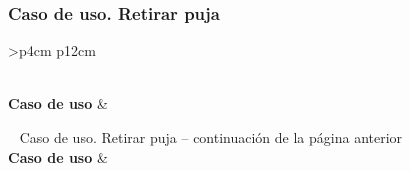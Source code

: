 \subsubsection{Caso de uso. Retirar puja} \label{sec:cu_retirar-puja}
\begin{longtable}{
    >{}p{4cm}
    p{12cm}
    }
    \caption{Caso de uso. Retirar puja} \label{table:cu_retirar-puja} \\
    \toprule
    \textbf{Caso de uso} &  \\
    \endfirsthead
    
    {{ \tablename\ \thetable{} Caso de uso. Retirar puja -- continuación de la página anterior}} \\
    \toprule
    \textbf{Caso de uso} &  \\
    \midrule
    \endhead
    
    \midrule
     \\ 
    \endfoot
    
    \bottomrule
    \endlastfoot
    

\end{longtable}
